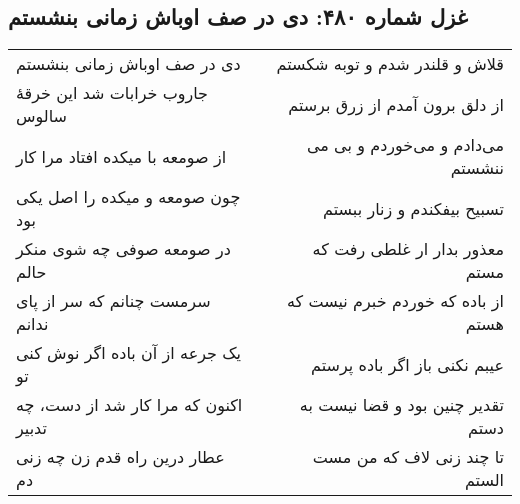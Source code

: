\begin{center}
\section*{غزل شماره ۴۸۰: دی در صف اوباش زمانی بنشستم}
\label{sec:480}
\begin{longtable}{l p{0.5cm} r}
دی در صف اوباش زمانی بنشستم
&&
قلاش و قلندر شدم و توبه شکستم
\\
جاروب خرابات شد این خرقهٔ سالوس
&&
از دلق برون آمدم از زرق برستم
\\
از صومعه با میکده افتاد مرا کار
&&
می‌دادم و می‌خوردم و بی می ننشستم
\\
چون صومعه و میکده را اصل یکی بود
&&
تسبیح بیفکندم و زنار ببستم
\\
در صومعه صوفی چه شوی منکر حالم
&&
معذور بدار ار غلطی رفت که مستم
\\
سرمست چنانم که سر از پای ندانم
&&
از باده که خوردم خبرم نیست که هستم
\\
یک جرعه از آن باده اگر نوش کنی تو
&&
عیبم نکنی باز اگر باده پرستم
\\
اکنون که مرا کار شد از دست، چه تدبیر
&&
تقدیر چنین بود و قضا نیست به دستم
\\
عطار درین راه قدم زن چه زنی دم
&&
تا چند زنی لاف که من مست الستم
\\
\end{longtable}
\end{center}
